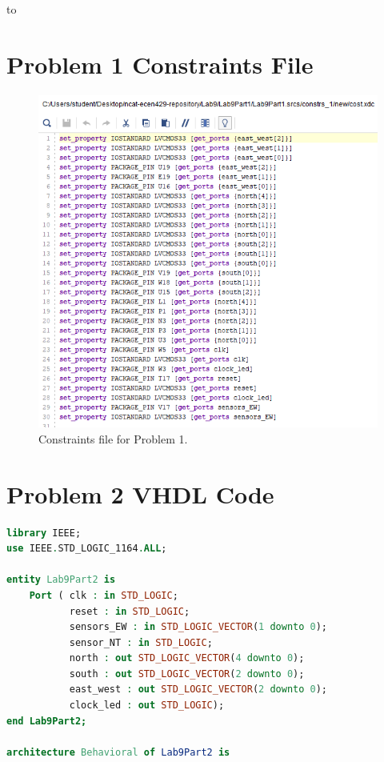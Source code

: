 to\documentclass[11pt]{article}
\begin{document}
\begin{appendices}
\section{Problem 1 Constraints File}
\begin{center}
\begin{figure}[H]
	\includegraphics[scale=1]{./images/Part1/l9p1const.png}
	\caption{\label{fig:Prob1Const}Constraints file for Problem 1.}
\end{figure}
\end{center}

\section{Problem 2 VHDL Code}
\begin{lstlisting}[language=VHDL]
library IEEE;
use IEEE.STD_LOGIC_1164.ALL;

entity Lab9Part2 is
    Port ( clk : in STD_LOGIC;
           reset : in STD_LOGIC;
           sensors_EW : in STD_LOGIC_VECTOR(1 downto 0);
           sensor_NT : in STD_LOGIC;
           north : out STD_LOGIC_VECTOR(4 downto 0);
           south : out STD_LOGIC_VECTOR(2 downto 0);
           east_west : out STD_LOGIC_VECTOR(2 downto 0);
           clock_led : out STD_LOGIC);
end Lab9Part2;

architecture Behavioral of Lab9Part2 is


\end{lstlisting}
\end{appendices}
\end{document}
